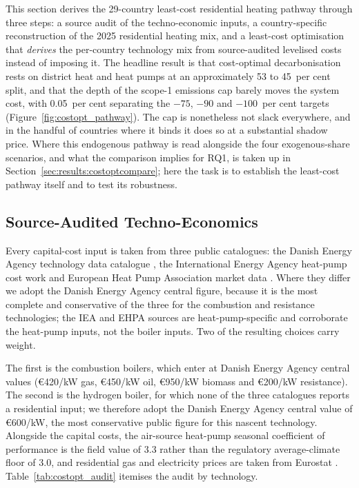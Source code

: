 This section derives the 29-country least-cost residential heating pathway through
three steps: a source audit of the techno-economic inputs, a country-specific
reconstruction of the 2025 residential heating mix, and a least-cost
optimisation that \emph{derives} the per-country technology
mix from source-audited levelised costs instead of imposing it. The headline
result is that cost-optimal decarbonisation rests on district heat and heat pumps
at an approximately 53 to 45~per cent split, and that the depth of the scope-1
emissions cap barely moves the system cost, with 0.05~per cent separating the
$-75$, $-90$ and $-100$~per cent targets (Figure~\ref{fig:costopt_pathway}). The
cap is nonetheless not slack everywhere, and in the handful of countries where it
binds it does so at a substantial shadow price. Where this endogenous pathway is read
alongside the four exogenous-share scenarios, and what the comparison implies
for RQ1, is taken up in Section~\ref{sec:results:costoptcompare}; here the task is to
establish the least-cost pathway itself and to test its robustness.

\subsection{Source-Audited Techno-Economics}
Every capital-cost input is taken from three public catalogues: the Danish
Energy Agency technology data catalogue \citep{DEA2023technology}, the International
Energy Agency heat-pump cost work \citep{IEA2022heatpumps} and European Heat Pump
Association market data \citep{EHPA2024market}. Where they differ we adopt
the Danish Energy Agency central figure, because it is the most complete
and conservative of the three for the combustion and resistance technologies; the IEA
and EHPA sources are heat-pump-specific and corroborate the heat-pump inputs, not the
boiler inputs. Two of the resulting choices carry weight.

The first is the combustion boilers, which enter at Danish
Energy Agency central values (\euro{}420/kW gas, \euro{}450/kW oil, \euro{}950/kW
biomass and \euro{}200/kW resistance). The second is the hydrogen boiler, for which
none of the three catalogues reports
a residential input; we therefore adopt the Danish Energy Agency central
value of \euro{}600/kW, the most conservative public figure for this nascent technology.
Alongside the capital costs, the air-source heat-pump seasonal coefficient of
performance is the field value of 3.3 rather than the regulatory average-climate floor
of 3.0, and residential gas and electricity prices are taken from
Eurostat \citep{Eurostat2025prices}. Table~\ref{tab:costopt_audit} itemises the audit by
technology.

